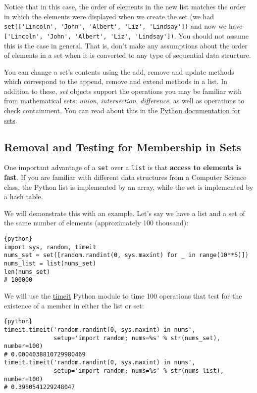 Notice that in this case, the order of elements in the new list
matches the order in which the elements were displayed when we create
the set (we had
\verb|set(['Lincoln', 'John', 'Albert', 'Liz', 'Lindsay'])| and now we
have \verb|['Lincoln', 'John', 'Albert', 'Liz', 'Lindsay'])|. You should
not assume this is the case in general. That is, don't make any
assumptions about the order of elements in a set when it is converted
to any type of sequential data structure.

You can change a set's contents using the add, remove and update methods
which correspond to the append, remove and extend methods in a list. In
addition to these, \emph{set} objects support the operations you may be
familiar with from mathematical sets: \emph{union}, \emph{intersection},
\emph{difference}, as well as operations to check containment. You can
read about this in the
\href{https://docs.python.org/2/library/stdtypes.html\#set}{Python
documentation for sets}.

\subsection{Removal and Testing for Membership in
Sets}\label{removal-and-testing-for-membership-in-sets}

One important advantage of a \verb|set| over a \verb|list| is that
\textbf{access to elements is fast}. If you are familiar with different
data structures from a Computer Science class, the Python list is
implemented by an array, while the set is implemented by a hash table.

We will demonstrate this with an example. Let's say we have a list and a
set of the same number of elements (approximately 100 thousand):

\begin{lstlisting}{python}
import sys, random, timeit
nums_set = set([random.randint(0, sys.maxint) for _ in range(10**5)])
nums_list = list(nums_set)
len(nums_set)
# 100000
\end{lstlisting}

We will use the
\href{https://docs.python.org/2/library/timeit.html}{timeit} Python
module to time 100 operations that test for the existence of a member in
either the list or set:

\begin{lstlisting}{python}
timeit.timeit('random.randint(0, sys.maxint) in nums', 
              setup='import random; nums=%s' % str(nums_set), number=100)
# 0.0004038810729980469
timeit.timeit('random.randint(0, sys.maxint) in nums', 
              setup='import random; nums=%s' % str(nums_list), number=100)
# 0.3980541229248047
\end{lstlisting}


